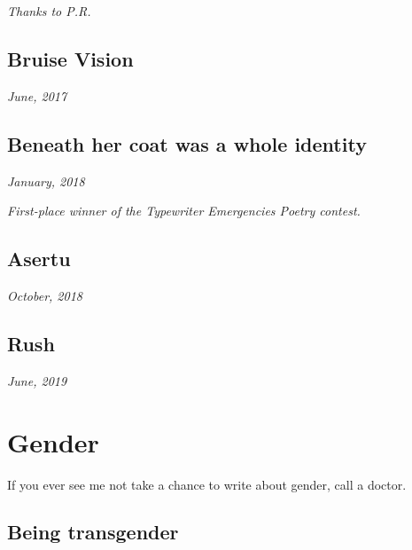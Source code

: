 \documentclass[10pt]{memoir}
\begin{document}
  \textit{Thanks to P.R.}
  \newpage


  \section{Bruise Vision}

  \hfill\textit{June, 2017}

  
  \newpage


  \section{Beneath her coat was a whole identity}

  \hfill\textit{January, 2018}

  

  \textit{First-place winner of the Typewriter Emergencies Poetry contest.}
  \newpage


  \section{Asertu}

  \hfill\textit{October, 2018}

  
  \newpage


  \section{Rush}

  \hfill\textit{June, 2019}

  
  \newpage


  \chapter{Gender}

  If you ever see me not take a chance to write about gender, call a doctor.

  \newpage

  \section{Being transgender}
\end{document}

